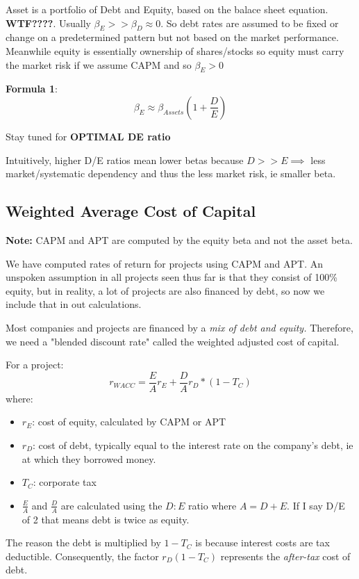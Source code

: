\documentclass{article}
\begin{document}
 Asset is a portfolio of Debt and Equity, based on the balace sheet equation. \textbf{WTF????}. Usually $\beta_{E} >> \beta_D \approx 0$. So debt rates are assumed to be fixed or change on a predetermined pattern but not based on the market performance. Meanwhile equity is essentially ownership of shares/stocks so equity must carry the market risk if we assume CAPM and so $\beta_E > 0$
 
 \textbf{Formula 1}:
 \[ 
 \beta_E \approx \beta_{Assets} (1+\frac{D}{E})
 \]
 
 Stay tuned for \textbf{OPTIMAL DE ratio}
 
 Intuitively, higher D/E ratios mean lower betas because $D >> E \implies$ less market/systematic dependency and thus the less market risk, ie smaller beta.
 
 \subsection{Weighted Average Cost of Capital}
 \textbf{Note:} CAPM and APT are computed by the equity beta and not the asset beta. 
 
 We have computed rates of return for projects using CAPM and APT. An unspoken assumption in all projects seen thus far is that they consist of 100\% equity, but in reality, a lot of projects are also financed by debt, so now we include that in out calculations. 
 
Most companies and projects are financed by a \textit{mix of debt and equity.} Therefore, we need a "blended discount rate" called the weighted adjusted cost of capital. 

For a project: 
\[
r_{WACC} = \frac{E}{A}r_E + \frac{D}{A}r_D*(1-T_C)
\]
where:
\begin{itemize}
\item $r_E$: cost of equity, calculated by CAPM or APT
\item $r_D$: cost of debt, typically equal to the interest rate on the company's debt, ie at which they borrowed money. 
\item $T_C$: corporate tax
\item $\frac{E}{A}$ and $\frac{D}{A}$ are calculated using the $D:E$ ratio where $A = D+E$. If I say D/E of 2 that means debt is twice as equity. 
\end{itemize}

The reason the debt is multiplied by $1-T_C$ is because interest costs are tax deductible. Consequently, the factor $r_D(1-T_C)$ represents the \textit{after-tax} cost of debt. 
\end{document}
